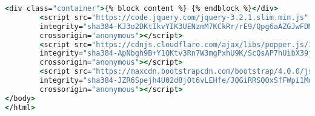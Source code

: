 \begin{lstlisting}[language=csh, caption={Ficheiro base.html}]
        <div class="container">{% block content %} {% endblock %}</div>
        <script src="https://code.jquery.com/jquery-3.2.1.slim.min.js"
        integrity="sha384-KJ3o2DKtIkvYIK3UENzmM7KCkRr/rE9/Qpg6aAZGJwFDMVNA/GpGFF93hXpG5KkN"
        crossorigin="anonymous"></script>
        <script src="https://cdnjs.cloudflare.com/ajax/libs/popper.js/1.12.9/umd/popper.min.js"
        integrity="sha384-ApNbgh9B+Y1QKtv3Rn7W3mgPxhU9K/ScQsAP7hUibX39j7fakFPskvXusvfa0b4Q"
        crossorigin="anonymous"></script>
        <script src="https://maxcdn.bootstrapcdn.com/bootstrap/4.0.0/js/bootstrap.min.js"
        integrity="sha384-JZR6Spejh4U02d8jOt6vLEHfe/JQGiRRSQQxSfFWpi1MquVdAyjUar5+76PVCmYl"
        crossorigin="anonymous"></script>
</body>
</html>
\end{lstlisting}